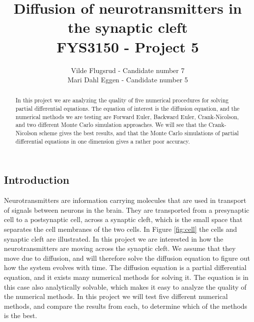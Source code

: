 \documentclass[12pt]{article}
\begin{document}
\title{Diffusion of neurotransmitters in the synaptic cleft \\
\vspace{5mm}
FYS3150 - Project 5}
\author{Vilde Flugsrud - Candidate number 7
\\ Mari Dahl Eggen - Candidate number 5}

\maketitle

\newpage

\tableofcontents

\newpage

\begin{flushleft}
\begin{abstract}
In this project we are analyzing the quality of five numerical procedures for solving partial differential equations. The equation of interest is the diffusion equation, and the numerical methods we are testing are Forward Euler, Backward Euler, Crank-Nicolson, and two different Monte Carlo simulation approaches. We will see that the Crank-Nicolson scheme gives the best results, and that the Monte Carlo simulations of partial differential equations in one dimension gives a rather poor accuracy.
\end{abstract}

\section{Introduction}
Neurotransmitters are information carrying molecules that are used in transport of signals between neurons in the brain. They are transported from a presynaptic cell to a postsynaptic cell, across a synaptic cleft, which is the small space that separates the cell membranes of the two cells. In Figure \ref{fig:cell} the cells and synaptic cleft are illustrated. In this project we are interested in how the neurotransmitters are moving across the synaptic cleft. We assume that they move due to diffusion, and will therefore solve the diffusion equation to figure out how the system evolves with time. The diffusion equation is a partial differential equation, and it exists many numerical methods for solving it. The equation is in this case also analytically solvable, which makes it easy to analyze the quality of the numerical methods. In this project we will test five different numerical methods, and compare the results from each, to determine which of the methods is the best.  


\end{flushleft}
\end{document}
